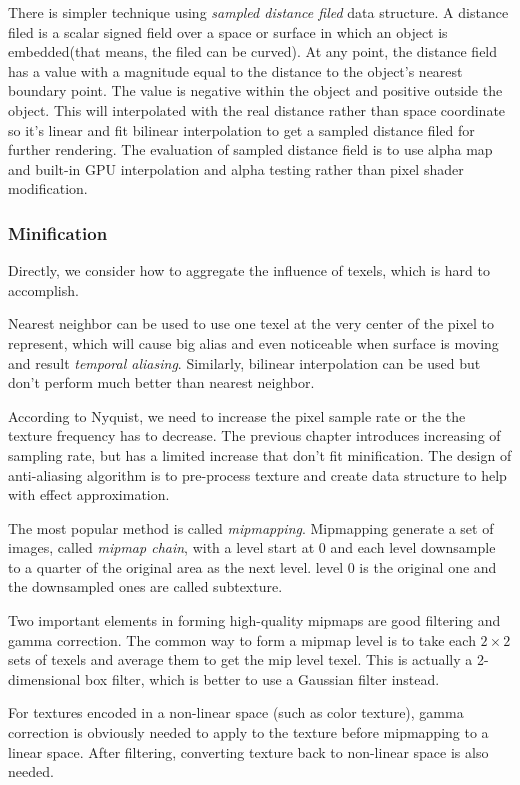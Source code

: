 \documentclass[10pt, a4paper]{article}
\begin{document}
    There is simpler technique using \emph{sampled distance filed} data structure. A distance filed is a scalar signed field over a space or surface in which an object is embedded(that means, the filed can be curved). At any point, the distance field has a value with a magnitude equal to the distance to the object's nearest boundary point. The value is negative within the object and positive outside the object. This will interpolated with the real distance rather than space coordinate so it's linear and fit bilinear interpolation to get a sampled distance filed for further rendering. The evaluation of sampled distance field is to use alpha map and built-in GPU interpolation and alpha testing rather than pixel shader modification.   
    
\subsubsection{Minification}
    Directly, we consider how to aggregate the influence of texels, which is hard to accomplish.

    Nearest neighbor can be used to use one texel at the very center of the pixel to represent, which will cause big alias and even noticeable when surface is moving and result  \emph{temporal aliasing}. Similarly, bilinear interpolation can be used but don't perform much better than nearest neighbor. 

    According to Nyquist, we need to increase the pixel sample rate or the the texture frequency has to decrease. The previous chapter introduces increasing of sampling rate, but has a limited increase that don't fit minification. The design of anti-aliasing algorithm is to pre-process texture and create data structure to help with effect approximation.
    
    The most popular method is called \emph{mipmapping}. Mipmapping generate a set of images, called \emph{mipmap chain}, with a level start at 0 and each level downsample to a quarter of the original area as the next level. level 0 is the original one and the downsampled ones are called subtexture. 

    Two important elements in forming high-quality mipmaps are good filtering and gamma correction. The common way to form a mipmap level is to take each $2 \times 2$ sets of texels and average them to get the mip level texel. This is actually a 2-dimensional box filter, which is better to use a Gaussian filter instead. 

    For textures encoded in a non-linear space (such as color texture), gamma correction is obviously needed to apply to the texture before mipmapping to a linear space. After filtering, converting texture back to non-linear space is also needed. 
    
\end{document}
